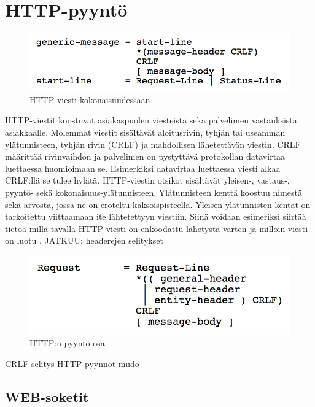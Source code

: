 \documentclass[utf8]{gradu3}
\begin{document}
\chapter{HTTP-pyyntö}

\begin{figure}[h]
\centering
\includegraphics[scale=0.85]{generic_message.png}
\caption{HTTP-viesti kokonaisuudessaan \cite{httprequest}}
\end{figure}

HTTP-viestit koostuvat asiakaspuolen viesteistä sekä palvelimen vastauksista asiakkaalle. Molemmat viestit sisältävät aloitusrivin, tyhjän tai useamman ylätunnisteen, tyhjän rivin (CRLF) ja mahdollisen lähetettävän viestin. CRLF määrittää rivinvaihdon ja palvelimen on pystyttävä protokollan datavirtaa luettaessa huomioimaan se. Esimerkiksi datavirtaa luettaessa viesti alkaa CRLF:llä se tulee hylätä. HTTP-viestin otsikot sisältävät yleisen-, vastaus-, pyyntö- sekä kokonaisuus-ylätunnisteen. Ylätunnisteen kenttä koostuu nimestä sekä arvosta, jossa ne on eroteltu kaksoispisteellä. Yleisen-ylätunnisten kentät on tarkoitettu viittaamaan ite lähtetettyyn viestiin. Siinä voidaan esimeriksi siirtää tietoa millä tavalla HTTP-viesti on enkoodattu lähetystä varten ja  milloin viesti on luotu \cite{httprequest}. JATKUU: headerejen selitykset



\begin{figure}[h]
\centering
\includegraphics[scale=0.85]{request_line.png}
\caption{HTTP:n pyyntö-osa \cite{httprequest}}
\end{figure}


CRLF selitys 
HTTP-pyynnöt mudo
\cite{httprequest}

\section{WEB-soketit}
\end{document}

